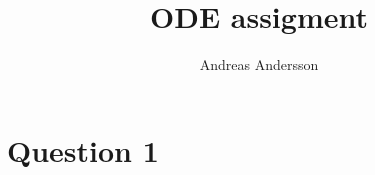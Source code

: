 \documentclass[
  twoside,
  11pt, a4paper,
  footinclude=true,
  headinclude=true,
  cleardoublepage=empty
]{scrbook}
\title{ODE assigment}
\author{Andreas Andersson}
\begin{document}
\maketitle


\chapter*{Question 1} 

    
\end{document}
